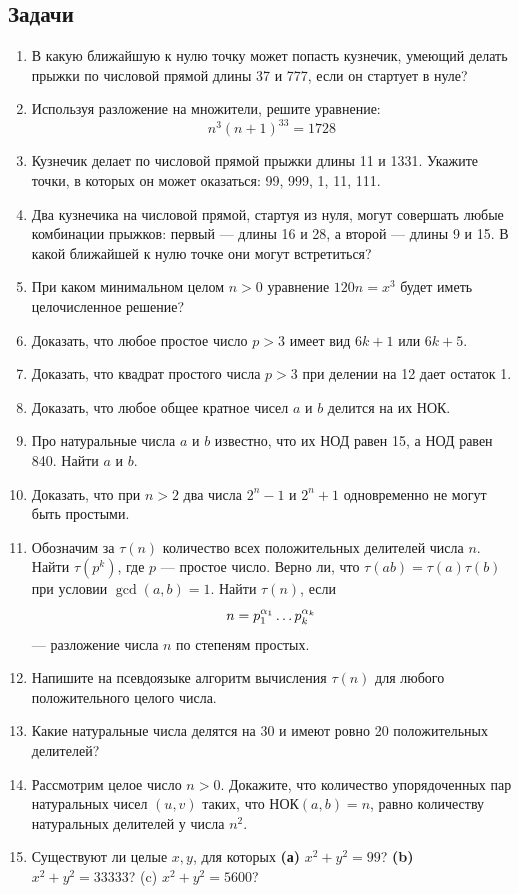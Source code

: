 \subsection*{Задачи}

\begin{enumerate}
\item В какую ближайшую к нулю точку может попасть кузнечик, умеющий делать прыжки по числовой прямой длины 37 и 777, если он стартует в нуле?
\item Используя разложение на множители, решите уравнение:
$$
n^3 (n + 1)^33 = 1728
$$
\item Кузнечик делает по числовой прямой прыжки длины 11 и 1331. Укажите точки, в которых он может оказаться: 99, 999, 1, 11, 111.
\item Два кузнечика на числовой прямой, стартуя из нуля, могут совершать любые комбинации прыжков: первый --- длины 16 и 28, а второй --- длины 9 и 15. В какой ближайшей к нулю точке они могут встретиться?
\item При каком минимальном целом $n > 0$ уравнение $120n = x^3$ будет иметь целочисленное решение?
\item Доказать, что любое простое число $p>3$ имеет вид $6k+1$ или $6k+5$.
\item Доказать, что квадрат простого числа $p>3$ при делении на 12 дает остаток 1.
\item Доказать, что любое общее кратное чисел $a$ и $b$ делится на их НОК.
\item Про натуральные числа $a$ и $b$ известно, что их НОД равен 15, а НОД равен 840. Найти $a$ и $b$.
\item Доказать, что при $n>2$ два числа $2^n-1$ и $2^n+1$ одновременно не могут быть простыми.
\item Обозначим за $\tau(n)$ количество всех положительных делителей числа $n$. Найти $\tau(p^k)$, где $p$ --- простое число. Верно ли, что $\tau(ab)=\tau(a)\tau(b)$ при условии $\gcd(a,b)=1$. Найти $\tau(n)$, если
$$
n=p_1^{\alpha_1}\dots p_k^{\alpha_k}
$$
--- разложение числа $n$ по степеням простых.
\item Напишите на псевдоязыке алгоритм вычисления $\tau(n)$ для любого положительного целого числа.

\item Какие натуральные числа делятся на 30 и имеют ровно 20 положительных делителей?
\item Рассмотрим целое число $n>0$. Докажите, что количество упорядоченных пар натуральных чисел $(u,v)$ таких, что НОК$(a,b)=n$, равно количеству натуральных делителей у числа $n^2$.
\item Существуют ли целые $x, y$, для которых \textbf{(а)} $x^2 + y^2 = 99$? \textbf{(b)}
$x^2 + y^2 = 33333$? (c) $x^2 + y^2 = 5600$?
\end{enumerate}



